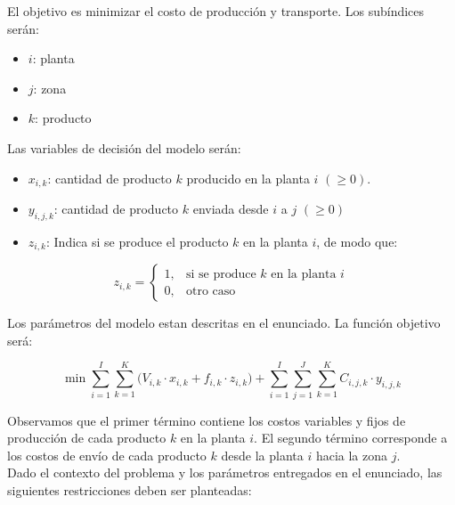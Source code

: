 El objetivo es minimizar el costo de producción y transporte. Los subíndices serán:
\begin{itemize}
    \item $i$: planta
    \item $j$: zona
    \item $k$: producto
\end{itemize}

Las variables de decisión del modelo serán:
\begin{itemize}
    \item $x_{i,k}$: cantidad de producto $k$ producido en la planta $i$ $(\geq 0)$.
    \item $y_{i,j,k}$: cantidad de producto $k$ enviada desde $i$ a $j$ $(\geq 0)$
    \item $z_{i,k}$: Indica si se produce el producto $k$ en la planta $i$, de modo que:
\end{itemize}

\[
z_{i,k} =
\begin{cases}
1, & \text{si se produce } k \text{ en la planta } i \\
0, & \text{otro caso}
\end{cases}
\]

Los parámetros del modelo estan descritas en el enunciado. La función objetivo será:

\[
\min \sum_{i=1}^{I} \sum_{k=1}^{K} \big(V_{i,k} \cdot x_{i,k} +  f_{i,k} \cdot z_{i,k} \big)
+ \sum_{i=1}^{I} \sum_{j=1}^{J} \sum_{k=1}^{K} C_{i,j,k} \cdot y_{i,j,k}
\]

Observamos que el primer término contiene los costos variables y fijos de producción de cada producto $k$ en la planta $i$. El segundo término corresponde a los costos de envío de cada producto $k$ desde la planta $i$ hacia la zona $j$. \\

Dado el contexto del problema y los parámetros entregados en el enunciado, las siguientes restricciones deben ser planteadas:

